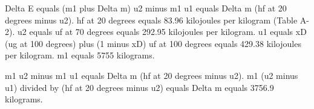 Delta E equals (m1 plus Delta m) u2 minus m1 u1 equals Delta m (hf at 20 degrees minus u2).  
hf at 20 degrees equals 83.96 kilojoules per kilogram (Table A-2).  
u2 equals uf at 70 degrees equals 292.95 kilojoules per kilogram.  
u1 equals xD (ug at 100 degrees) plus (1 minus xD) uf at 100 degrees equals 429.38 kilojoules per kilogram.  
m1 equals 5755 kilograms.  

m1 u2 minus m1 u1 equals Delta m (hf at 20 degrees minus u2).  
m1 (u2 minus u1) divided by (hf at 20 degrees minus u2) equals Delta m equals 3756.9 kilograms.